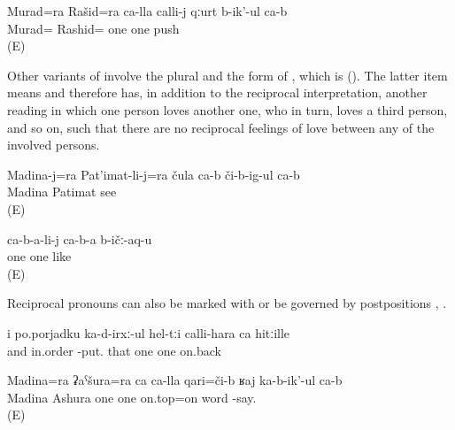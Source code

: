 \begin{exe}
	\ex	\label{ex:Murad and Rashid push each other.GEN}
	\gll	Murad=ra Rašid=ra ca-lla calli-j qːurt b-ik'-ul ca-b\\
	Murad= Rashid= one	one	push  \\
	\glt	{} (E)
\end{exe}


Other variants of  involve the plural   and the  form of  , which is   (). The latter item means  and therefore  has, in addition to the reciprocal interpretation, another reading in which one person loves another one, who in turn, loves a third person, and so on, such that there are no reciprocal feelings of love between any of the involved persons.
%
\begin{exe}
		\ex	\label{ex:Madina and Patimat see each other@14a}
		\gll	Madina-j=ra	Pat'imat-li-j=ra	čula	ca-b 	či-b-ig-ul	ca-b\\
			Madina	Patimat			see	\\
		\glt	{} (E)

		\ex	\label{ex:(They) love each other@14b}
		\gll	ca-b-a-li-j	ca-b-a	b-ičː-aq-u\\
			one	one	like\\
		\glt	{} (E)

\end{exe}

Reciprocal pronouns can also be marked with   or be governed by postpositions , .
%
\begin{exe}
	\ex	\label{ex:and putting them in order one after the other}
	\gll	i	po.porjadku	ka-d-irxː-ul	hel-tːi	calli-hara	ca	hitːille\\
		and	in.order	-put.	that	one	one	on.back\\
	\glt	{}

	\ex	\label{ex:Madina and Ashura talk about each other}
	\gll	Madina=ra	ʡaˁšura=ra	ca	ca-lla	qari=či-b	ʁaj	ka-b-ik'-ul	ca-b\\
		Madina	Ashura	one	one	on.top=on	word	-say.	\\
	\glt	{} (E)
\end{exe}

